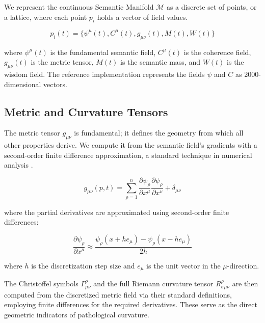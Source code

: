 We represent the continuous Semantic Manifold \(\mathcal{M}\) as a discrete set of points, or a lattice, where each point \(p_i\) holds a vector of field values.

\begin{equation}
p_i(t) = \{\psi^\mu(t), C^\mu(t), g_{\mu\nu}(t), M(t), W(t)\}
\end{equation}

where \(\psi^\mu(t)\) is the fundamental semantic field, \(C^\mu(t)\) is the coherence field, \(g_{\mu\nu}(t)\) is the metric tensor, \(M(t)\) is the semantic mass, and \(W(t)\) is the wisdom field. The reference implementation represents the fields \(\psi\) and \(C\) as 2000-dimensional vectors.


\subsection{Metric and Curvature Tensors}
\label{17.2.2:metric_and_curvature_tensors}

The metric tensor \(g_{\mu\nu}\) is fundamental; it defines the geometry from which all other properties derive. We compute it from the semantic field's gradients with a second-order finite difference approximation, a standard technique in numerical analysis \autocite{BurdenFairesBurden2016}.

\begin{equation}
g_{\mu\nu}(p,t) = \sum_{\rho=1}^n \frac{\partial \psi_\rho}{\partial x^\mu} \frac{\partial \psi_\rho}{\partial x^\nu} + \delta_{\mu\nu}
\end{equation}

where the partial derivatives are approximated using second-order finite differences:

\begin{equation}
\frac{\partial \psi_\rho}{\partial x^\mu} \approx \frac{\psi_\rho(x + h e_\mu) - \psi_\rho(x - h e_\mu)}{2h}
\end{equation}

where \(h\) is the discretization step size and \(e_\mu\) is the unit vector in the \(\mu\)-direction.

The Christoffel symbols \(\Gamma^\rho_{\mu\nu}\) and the full Riemann curvature tensor \(R^{\rho}_{\sigma\mu\nu}\) are then computed from the discretized metric field via their standard definitions, employing finite differences for the required derivatives. These serve as the direct geometric indicators of pathological curvature.

